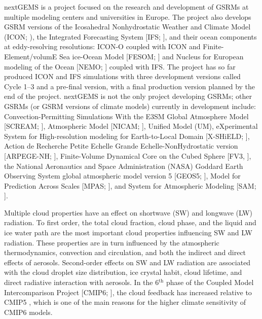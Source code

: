 \documentclass[draft]{agujournal2019}
\begin{document}
nextGEMS is a project  focused on the research and development of GSRMs at multiple modeling centers and universities in Europe. The project also develops GSRM versions of the Icosahedral Nonhydrostatic Weather and Climate Model (ICON; ), the Integrated Forecasting System [IFS; ], and their ocean components at eddy-resolving resolutions: ICON-O  coupled with ICON and Finite-Element/volumE Sea ice-Ocean Model [FESOM; ] and Nucleus for European modeling of the Ocean [NEMO; ] coupled with IFS. The project has so far produced ICON and IFS simulations with three development versions called Cycle 1--3 and a pre-final version, with a final production version planned by the end of the project. nextGEMS is not the only project developing GSRMs; other GSRMs (or GSRM versions of climate models) currently in development include: Convection-Permitting Simulations With the E3SM Global Atmosphere Model [SCREAM; ], Atmospheric Model [NICAM; ], Unified Model (UM), eXperimental System for High-resolution modeling for Earth-to-Local Domain [X-SHiELD; ], Action de Recherche Petite Echelle Grande Echelle-NonHydrostatic version [ARPEGE-NH; ], Finite-Volume Dynamical Core on the Cubed Sphere [FV3, ], the National Aeronautics and Space Administration (NASA) Goddard Earth Observing System global atmospheric model version 5 [GEOS5; ], Model for Prediction Across Scales [MPAS; ], and System for Atmospheric Modeling [SAM; ].

Multiple cloud properties have an effect on shortwave (SW) and longwave (LW) radiation. To first order, the total cloud fraction, cloud phase, and the liquid and ice water path are the most important cloud properties influencing SW and LW radiation. These properties are in turn influenced by the atmospheric thermodynamics, convection and circulation, and both the indirect and direct effects of aerosols. Second-order effects on SW and LW radiation are associated with the cloud droplet size distribution, ice crystal habit, cloud lifetime, and direct radiative interaction with aerosols. In the 6$^\mathrm{th}$ phase of the Coupled Model Intercomparison Project [CMIP6; ], the cloud feedback has increased relative to CMIP5 , which is one of the main reasons for the higher climate sensitivity of CMIP6 models.
\end{document}
